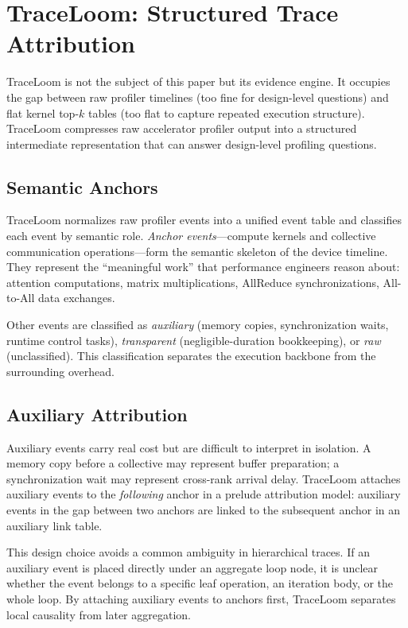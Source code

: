 \documentclass[conference]{IEEEtran}
\begin{document}
\section{TraceLoom: Structured Trace Attribution}
\label{sec:traceloom}

TraceLoom is not the subject of this paper but its evidence engine. It occupies
the gap between raw profiler timelines (too fine for design-level questions)
and flat kernel top-$k$ tables (too flat to capture repeated execution
structure). TraceLoom compresses raw accelerator profiler output into a
structured intermediate representation that can answer design-level profiling
questions.

\subsection{Semantic Anchors}

TraceLoom normalizes raw profiler events into a unified event table and
classifies each event by semantic role. \emph{Anchor events}---compute kernels
and collective communication operations---form the semantic skeleton of the
device timeline. They represent the ``meaningful work'' that performance
engineers reason about: attention computations, matrix multiplications,
AllReduce synchronizations, All-to-All data exchanges.

Other events are classified as \emph{auxiliary} (memory copies, synchronization
waits, runtime control tasks), \emph{transparent} (negligible-duration
bookkeeping), or \emph{raw} (unclassified). This classification separates the
execution backbone from the surrounding overhead.

\subsection{Auxiliary Attribution}

Auxiliary events carry real cost but are difficult to interpret in isolation.
A memory copy before a collective may represent buffer preparation; a
synchronization wait may represent cross-rank arrival delay. TraceLoom
attaches auxiliary events to the \emph{following} anchor in a prelude
attribution model: auxiliary events in the gap between two anchors are linked
to the subsequent anchor in an auxiliary link table.

This design choice avoids a common ambiguity in hierarchical traces. If an
auxiliary event is placed directly under an aggregate loop node, it is unclear
whether the event belongs to a specific leaf operation, an iteration body, or
the whole loop. By attaching auxiliary events to anchors first, TraceLoom
separates local causality from later aggregation.
\end{document}
